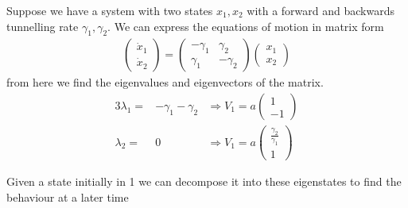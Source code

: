
Suppose we have a system with two states
\(x_1, x_2\)
with a forward and backwards
tunnelling rate \(\gamma_1, \gamma_2\).
We can express the equations of motion
in matrix form
\begin{align}
    \begin{pmatrix}
        \dot{x}_1 \\
        \dot{x}_2
    \end{pmatrix} = \begin{pmatrix}
        -\gamma_1 & \gamma_2   \\
        \gamma_1  & - \gamma_2
    \end{pmatrix}\begin{pmatrix}
        x_1 \\
        x_2
    \end{pmatrix}
\end{align}
from here we find the eigenvalues
and eigenvectors of the matrix.
\begin{alignat}{3}
    \lambda_1  = & -\gamma_1 - \gamma_2
                 & \Rightarrow V_1  = a\begin{pmatrix}
        1 \\
        -1
    \end{pmatrix} \\
    \lambda_2  = & 0
                 & \Rightarrow V_1  =a\begin{pmatrix}
        \frac{\gamma_2}{\gamma_1} \\
        1
    \end{pmatrix}
\end{alignat}

Given a state initially in 1
we can decompose it into these
eigenstates to find the behaviour
at a later time

